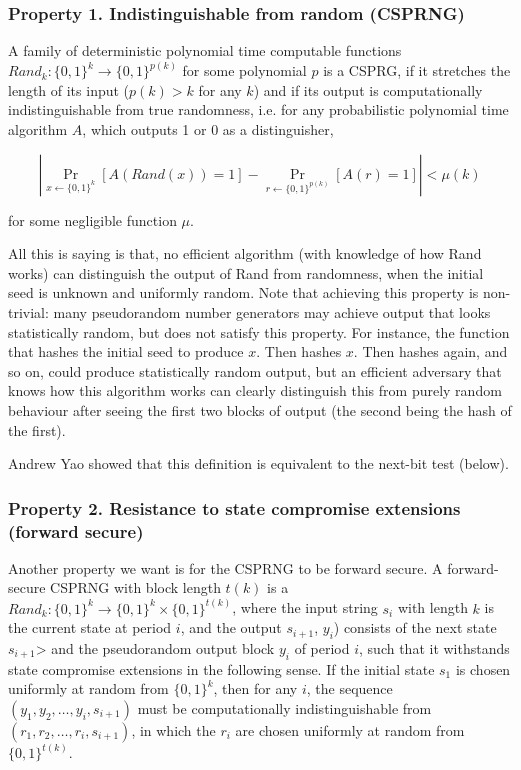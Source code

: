 \documentclass[12pt]{article}
\begin{document}
\subsubsection*{Property 1. Indistinguishable from random (CSPRNG)}

A family of deterministic polynomial time computable functions $Rand_{k} \colon \{0, 1\}^{k} \rightarrow \{0, 1 \}^{p(k)}$ for some polynomial $p$ is a  CSPRG, if it stretches the length of its input ($p(k) > k$ for any $k$) and if its output is computationally indistinguishable from true randomness, i.e. for any probabilistic polynomial time algorithm $A$, which outputs 1 or 0 as a distinguisher,

$$ |\Pr_{x\gets\{0,1\}^k}[A(Rand(x))=1] - \Pr_{r\gets\{0,1\}^{p(k)}}[A(r)=1]| < \mu(k) $$

\noindent for some negligible function $\mu$.

All this is saying is that, no efficient algorithm (with knowledge of how Rand works) can distinguish the output of Rand from randomness, when the initial seed is unknown and uniformly random. Note that achieving this property is non-trivial: many pseudorandom number generators may achieve output that looks statistically random, but does not satisfy this property. For instance, the function that hashes the initial seed to produce $x$. Then hashes $x$. Then hashes again, and so on, could produce statistically random output, but an efficient adversary that knows how this algorithm works can clearly distinguish this from purely random behaviour after seeing the first two blocks of output (the second being the hash of the first).

Andrew Yao showed that this definition is equivalent to the next-bit test (below).

\subsubsection*{Property 2. Resistance to state compromise extensions (forward secure)}
Another property we want is for the CSPRNG to be forward secure. A forward-secure CSPRNG with block length $t(k)$ is a $Rand_{k} \colon \{0,1\}^k \to \{0,1\}^k \times \{0,1\}^{t(k)}$, where the input string $s_i$ with length $k$ is the current state at period $i$, and the output $s_{i+1}$, $y_i$) consists of the next state $s_{i+1}$> and the pseudorandom output block $y_i$ of period $i$, such that it withstands state compromise extensions in the following sense. If the initial state $s_1$ is chosen uniformly at random from $\{0,1\}^k$, then for any $i$, the sequence $(y_1, y_2,\dots, y_i,s_{i+1})$ must be computationally indistinguishable from $(r_1,r_2,\dots,r_i,s_{i+1})$, in which the $r_i$ are chosen uniformly at random from $\{0,1\}^{t(k)}$.
\end{document}

